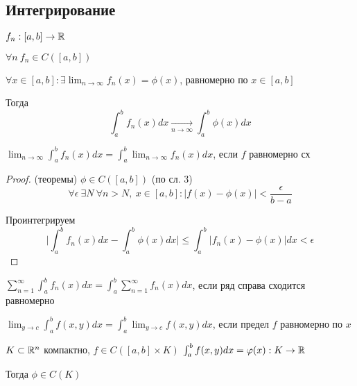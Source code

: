     \subsection*{Интегрирование}

    \begin{theorem}
        $f_n : [a, b] \rightarrow \mathbb{R}$
        \par $\forall n \ f_n \in C([a, b])$
        \par $\forall x \in [a, b] : \exists \lim_{n \rightarrow \infty} f_n(x) = \phi(x)$, равномерно по $x \in [a, b]$
        \par Тогда
        \[
            \int_a^b f_n(x) dx \xrightarrow[n \rightarrow \infty]{}  \int_a^b \phi(x) dx   
        \]
        \begin{remark}
            $\displaystyle
            \lim_{n \rightarrow \infty} \int_a^b f_n(x) dx = \int_a^b \lim_{n \rightarrow \infty} f_n(x) dx    
            $, если $f$ равномерно сх
        \end{remark}
    \end{theorem}

    \begin{proof}(теоремы)
        $\phi \in C([a, b])$ (по сл. 3)
        \[
            \forall \epsilon \ \exists N \ \forall n > N, \ x \in [a, b] : |f(x) - \phi(x)| < \frac{\epsilon}{b - a}    
        \]
        \par Проинтегрируем
        \[
            \Big|\int_a^b f_n(x)dx - \int_a^b \phi(x)dx\Big| \le \int_a^b\big|f_n(x) - \phi(x)\big| dx < \epsilon
        \]
    \end{proof}

    \begin{corollary}%
        $\displaystyle
            \sum_{n=1}^\infty \int_a^b f_n(x) dx  = \int_a^b \sum_{n=1}^\infty f_n(x) dx  
        $, если ряд справа сходится равномерно
    \end{corollary}

    \begin{corollary} %
        $\displaystyle
            \lim_{y \rightarrow c} \int_a^b f(x, y) dx = \int_a^b \lim_{y \rightarrow c} f(x, y) dx    
        $, если предел $f$ равномерно по $x$
    \end{corollary}

    \begin{corollary}
        $K \subset \mathbb{R}^n$ компактно, $f \in C([a, b] \times K)$ \quad $\int_a^b f(x, y) dx = \varphi(x) : K \rightarrow \mathbb{R}$
        \par Тогда $\phi \in C(K)$
    \end{corollary}

